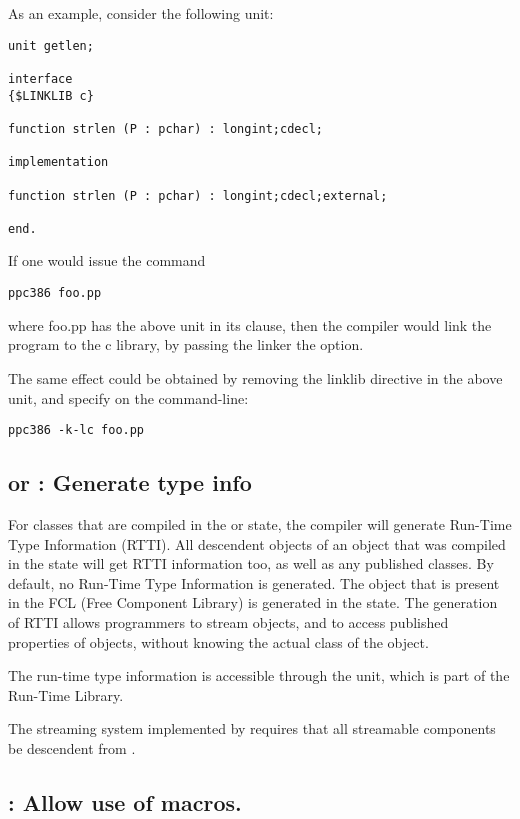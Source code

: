 As an example, consider the following unit:
\begin{verbatim}
unit getlen;

interface
{$LINKLIB c}

function strlen (P : pchar) : longint;cdecl;

implementation

function strlen (P : pchar) : longint;cdecl;external;

end.
\end{verbatim}
If one would issue the command
\begin{verbatim}
ppc386 foo.pp
\end{verbatim}
where foo.pp has the above unit in its  clause,
then the compiler would link the program to the c library, by passing the
linker the  option.

The same effect could be obtained by removing the linklib directive in the
above unit, and specify  on the command-line:
\begin{verbatim}
ppc386 -k-lc foo.pp
\end{verbatim}

\subsection{ or  : Generate type info}

For classes that are compiled in the  or 
state, the compiler will generate Run-Time Type Information (RTTI). All
descendent objects of an object that was compiled in the  state
will get RTTI information too, as well as any published classes.
By default, no Run-Time Type Information is generated. The 
object that is present in the FCL (Free Component Library) is generated in
the  state. The generation of RTTI allows programmers to
stream objects, and to access published properties of objects, without
knowing the actual class of the object.

The run-time type information is accessible through the  unit,
which is part of the \fpc Run-Time Library.

\begin{remark}
The streaming system implemented by \fpc requires that all
streamable components be descendent from .
\end{remark}

\subsection{ : Allow use of macros.}

